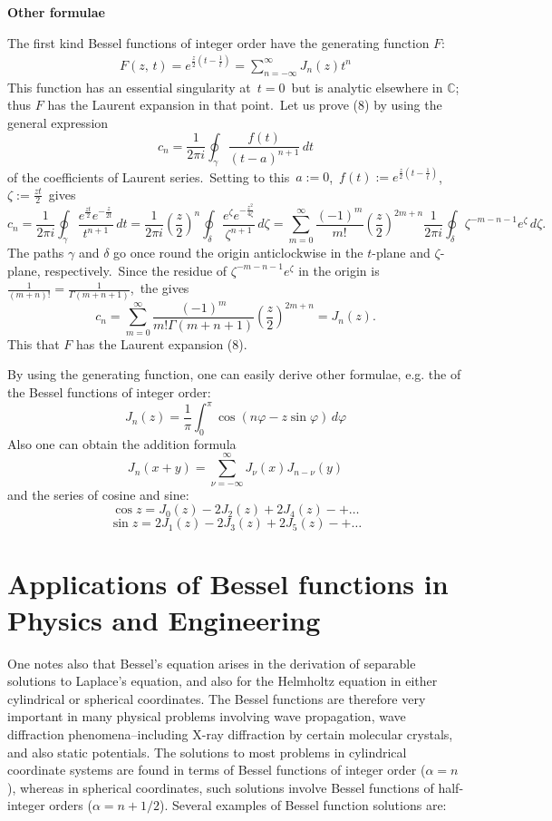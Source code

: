 \documentclass[12pt]{article}
\theoremstyle{plain}
\theoremstyle{definition}
\numberwithin{equation}{section}
\begin{document}
\textbf{Other formulae}

The first kind Bessel functions of integer order have the generating function $F$:
\begin{align}
F(z,\,t) = e^{\frac{z}{2}(t-\frac{1}{t})}
= \sum_{n=-\infty}^\infty J_n(z)t^n
\end{align}
This function has an essential singularity at\, $t = 0$\, but is analytic elsewhere in $\mathbb{C}$; thus $F$ has the Laurent expansion in that point.\, Let us prove (8) by using the general expression
$$c_n = \frac{1}{2\pi i}\oint_{\gamma} \frac{f(t)}{(t-a)^{n+1}}\,dt$$
of the coefficients of Laurent series.\, Setting to this\, $a := 0$,\, 
$f(t) := e^{\frac{z}{2}(t-\frac{1}{t})}$,\, $\zeta := \frac{zt}{2}$\, gives
$$c_n = \frac{1}{2\pi i}
\oint_\gamma\frac{e^{\frac{zt}{2}}e^{-\frac{z}{2t}}}{t^{n+1}}\,dt = 
\frac{1}{2\pi i}\left(\frac{z}{2}\right)^n\!
\oint_\delta\frac{e^\zeta e^{-\frac{z^2}{4\zeta}}}{\zeta^{n+1}}\,d\zeta = 
\sum_{m=0}^\infty\frac{(-1)^m}{m!}\left(\frac{z}{2}\right)^{2m+n}\!
\frac{1}{2\pi i}\oint_\delta \zeta^{-m-n-1}e^\zeta\,d\zeta.$$
The paths $\gamma$ and $\delta$ go once round the origin anticlockwise in the $t$-plane and $\zeta$-plane, respectively.\, Since the residue of $\zeta^{-m-n-1}e^\zeta$ in the origin is\, $\frac{1}{(m+n)!} = \frac{1}{\Gamma(m+n+1)}$,\, the  gives
$$c_n = \sum_{m=0}^\infty
\frac{(-1)^m}{m!\Gamma(m+n+1)}\left(\frac{z}{2}\right)^{2m+n} = J_n(z).$$
This  that $F$ has the Laurent expansion (8).

By using the generating function, one can easily derive other formulae, e.g.
the  of the Bessel functions of integer order:
$$J_n(z) = \frac{1}{\pi}\int_0^\pi\cos(n\varphi-z\sin{\varphi})\,d\varphi$$
Also one can obtain the addition formula
$$J_n(x+y) = \sum_{\nu=-\infty}^{\infty}J_\nu(x)J_{n-\nu}(y)$$
and the series  of cosine and sine:
$$\cos{z} = J_0(z)-2J_2(z)+2J_4(z)-+\ldots$$
$$\sin{z} = 2J_1(z)-2J_3(z)+2J_5(z)-+\ldots$$

\section{Applications of Bessel functions in Physics and Engineering}

One notes also that Bessel's equation arises in the derivation of separable solutions to Laplace's equation, and also for the Helmholtz equation in either cylindrical or spherical coordinates. The Bessel functions are therefore very important in many physical problems involving wave propagation, wave diffraction phenomena--including X-ray diffraction by certain molecular crystals, and also static potentials. The solutions to most problems in cylindrical coordinate systems are found in terms of Bessel functions of integer order ($\alpha = n$), whereas in spherical coordinates, such solutions involve Bessel functions of half-integer orders ($\alpha = n + 1/2$). 
Several examples of Bessel function solutions are:
\end{document}
